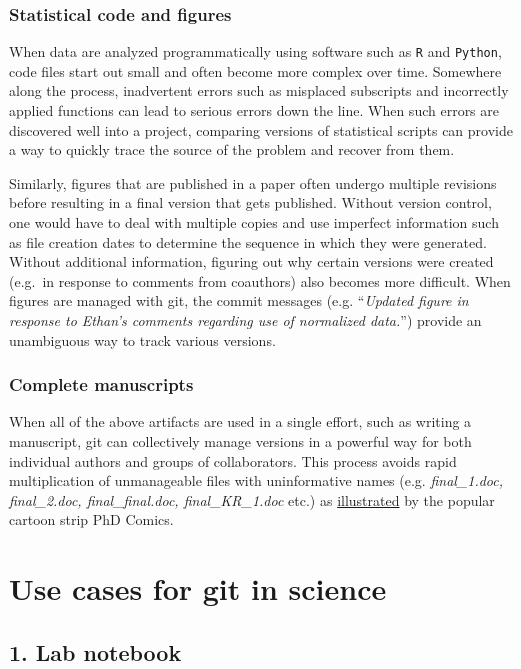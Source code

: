 \documentclass[]{article}
\begin{document}
\subsubsection{Statistical code and figures}

When data are analyzed programmatically using software such as
\texttt{R} and \texttt{Python}, code files start out small and often
become more complex over time. Somewhere along the process, inadvertent
errors such as misplaced subscripts and incorrectly applied functions
can lead to serious errors down the line. When such errors are
discovered well into a project, comparing versions of statistical
scripts can provide a way to quickly trace the source of the problem and
recover from them.

Similarly, figures that are published in a paper often undergo multiple
revisions before resulting in a final version that gets published.
Without version control, one would have to deal with multiple copies and
use imperfect information such as file creation dates to determine the
sequence in which they were generated. Without additional information,
figuring out why certain versions were created (e.g.~in response to
comments from coauthors) also becomes more difficult. When figures are
managed with git, the commit messages (e.g. ``\emph{Updated figure in
response to Ethan's comments regarding use of normalized data.}'')
provide an unambiguous way to track various versions.

\subsubsection{Complete manuscripts}

When all of the above artifacts are used in a single effort, such as
writing a manuscript, git can collectively manage versions in a powerful
way for both individual authors and groups of collaborators. This
process avoids rapid multiplication of unmanageable files with
uninformative names (e.g. \emph{final\_1.doc, final\_2.doc,
final\_final.doc, final\_KR\_1.doc} etc.) as
\href{http://www.phdcomics.com/comics/archive.php?comicid=1531}{illustrated}
by the popular cartoon strip PhD Comics.

\section{Use cases for git in science}

\subsection{1. Lab notebook}
\end{document}
